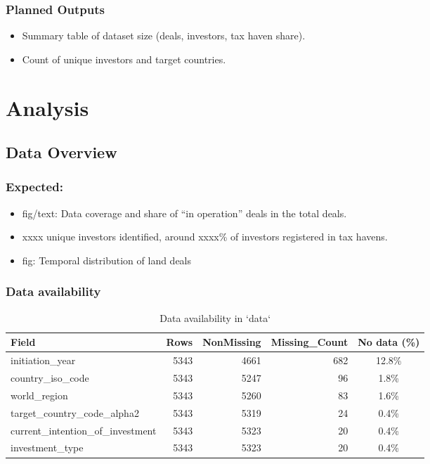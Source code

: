 \documentclass[
  letterpaper,
  DIV=11,
  numbers=noendperiod]{scrreprt}
\providecommand{\tightlist}{%
  \setlength{\itemsep}{0pt}\setlength{\parskip}{0pt}}
\begin{document}
\subsection{Planned Outputs}\label{planned-outputs}

\begin{itemize}
\tightlist
\item
  Summary table of dataset size (deals, investors, tax haven share).
\item
  Count of unique investors and target countries.
\end{itemize}


\chapter{Analysis}\label{analysis}

\section{Data Overview}\label{data-overview}

\subsection{\texorpdfstring{\textbf{Expected:}}{Expected:}}\label{expected}

\begin{itemize}
\item
  fig/text: Data coverage and share of ``in operation'' deals in the
  total deals.
\item
  xxxx unique investors identified, around xxxx\% of investors
  registered in tax havens.
\item
  fig: Temporal distribution of land deals
\end{itemize}

\subsection{Data availability}\label{data-availability}

\begin{longtable}[t]{lrrrc}
\caption{\label{tab:check-availability}Data availability in `data`}\\
\toprule
Field & Rows & NonMissing & Missing\_Count & No data (\%)\\
\midrule
initiation\_year & 5343 & 4661 & 682 & 12.8\%\\
country\_iso\_code & 5343 & 5247 & 96 & 1.8\%\\
world\_region & 5343 & 5260 & 83 & 1.6\%\\
target\_country\_code\_alpha2 & 5343 & 5319 & 24 & 0.4\%\\
current\_intention\_of\_investment & 5343 & 5323 & 20 & 0.4\%\\
\addlinespace
investment\_type & 5343 & 5323 & 20 & 0.4\%\\
\bottomrule
\end{longtable}
\end{document}
